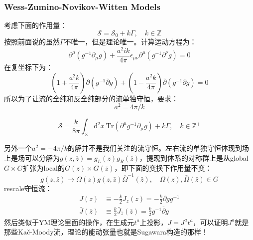 \subsubsection{Wess-Zumino-Novikov-Witten Models}
考虑下面的作用量：
\begin{equation}
	\mathcal{S}=\mathcal{S}_0+k\Gamma,\quad k\in\mathbb{Z}
\end{equation}
按照前面说的虽然$\Gamma$不唯一，但是理论唯一。计算运动方程为：
\begin{equation}
	\partial^\mu(g^{-1}\partial_\mu g)+\frac{a^2ik}{4\pi}\epsilon_{\mu\nu}\partial^\mu(g^{-1}\partial^\nu g)=0
\end{equation}
在复坐标下为：
\begin{equation}
	\left(1+\frac{a^2k}{4\pi}\right)\partial(g^{-1}\overline{\partial}g)+\left(1-\frac{a^2k}{4\pi}\right)\overline{\partial}(g^{-1}\partial g)=0
\end{equation}
所以为了让流的全纯和反全纯部分的流单独守恒，要求：
\begin{equation}
	a^2=4\pi/k
\end{equation}
\begin{theorem}
	\begin{equation}
		\mathcal{S}=\frac k{8\pi}\int_\Sigma\mathrm{d}^2x\mathrm{~Tr}\left(\partial^\mu g^{-1}\partial_\mu g\right)+k\Gamma ,\quad k\in\mathbb{Z}^+
	\end{equation}
\end{theorem}
另外一个$a^2=-4\pi/k$的解并不是我们关注的流守恒。左右流的单独守恒体现到场上是场可以分解为$g(z,\overline{z})=g_L(z)g_R(\overline{z})$，提现到体系的对称群上是从global $G\times G$扩张为local的$G(z)\times  G(\bar z)$，即下面的变换下作用量不变：
\begin{equation}
	g(z,\bar{z})\to\Omega(z)g(z,\bar{z})\overline{\Omega}^{-1}(\bar{z}),\quad \Omega(z),\bar \Omega(\bar z)\in G
\end{equation}
rescale守恒流：
\begin{equation}
	\begin{aligned}
		{J(z)} &\equiv-\frac k2J_z(z)=-\frac k2\partial gg^{-1} \\
	\bar{J}(\overline{z}) &\equiv\frac k2\bar{J}_{\overline{z}}(\overline{z})=\frac k2g^{-1}\overline{\partial}g
	\end{aligned}
\end{equation}
然后类似于YM理论里面的操作，在生成元$t^a$上投影，$J=J^at^a$，可以证明$J^a$就是那些Ka\v{c}\mbox{-}Moody流，理论的能动张量也就是Sugawara构造的那样！

